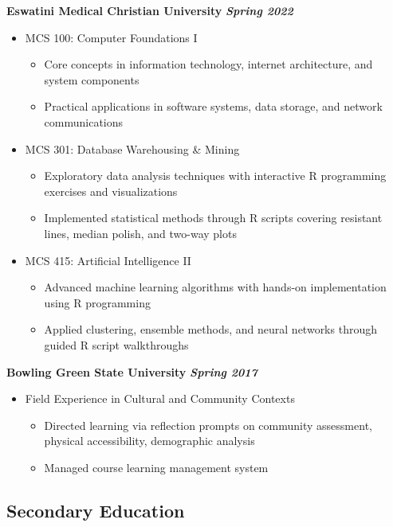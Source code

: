 \documentclass[11pt,letterpaper]{article}
\begin{document}
\textbf{Eswatini Medical Christian University} \hfill \textbf{\textit{Spring 2022}}
\begin{itemize}
    \item MCS 100: Computer Foundations I
    \begin{itemize}
        \item Core concepts in information technology, internet architecture, and system components
        \item Practical applications in software systems, data storage, and network communications
    \end{itemize}
    \item MCS 301: Database Warehousing \& Mining
    \begin{itemize}
        \item Exploratory data analysis techniques with interactive R programming exercises and visualizations
        \item Implemented statistical methods through R scripts covering resistant lines, median polish, and two-way plots
    \end{itemize}
    \item MCS 415: Artificial Intelligence II
    \begin{itemize}
        \item Advanced machine learning algorithms with hands-on implementation using R programming
        \item Applied clustering, ensemble methods, and neural networks through guided R script walkthroughs
    \end{itemize}
\end{itemize}

\textbf{Bowling Green State University} \hfill \textbf{\textit{Spring 2017}}
\begin{itemize}
    \item Field Experience in Cultural and Community Contexts
    \begin{itemize}
        \item Directed learning via reflection prompts on community assessment, physical accessibility, demographic analysis
        \item Managed course learning management system
    \end{itemize}
\end{itemize}

\subsection*{Secondary Education}
\end{document}
